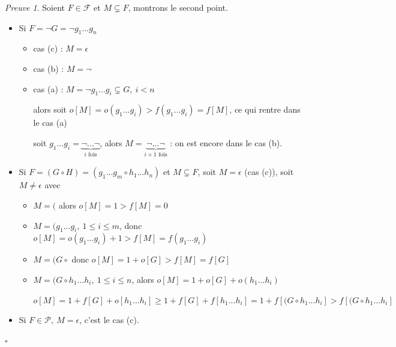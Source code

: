 \documentclass[]{article}
\theoremstyle{remark}
\newtheorem{myproof}{Preuve}
\theoremstyle{definition}
\newcommand{\cqfd}{
	\hfill$\square$
}
\begin{document}
\begin{myproof}
	Soient $F \in \mathcal{F}$ et $M \subsetneq F$, montrons le second point.
	
	\begin{itemize}
		\item Si $F=\neg G = \neg g_1 ... g_n$
		
		\begin{itemize}
			\item cas (c) : $M=\epsilon$
			\item cas (b) : $M=\neg$
			\item cas (a) : $M=\neg g_1 ... g_i \subsetneq G, ~ i < n$
			
			alors soit $o[M] = o(g_1...g_i) > f(g_1 ... g_i) = f[M]$, ce qui rentre dans le cas (a)
			
			soit $g_1...g_i = \underbrace{\neg ... \neg}_{i \text{ fois}}$, alors $M=\underbrace{\neg ... \neg}_{i + 1 \text{ fois}}$ : on est encore dans le cas (b).
		\end{itemize}
		
		\item Si $F=(G \circ H) = (g_1 ... g_m \circ h_1 ... h_n)$ et $M \subsetneq F$, soit $M=\epsilon$ (cas (c)), soit $M \neq \epsilon$ avec
		
		\begin{itemize}
			\item $M=($ alors $o[M]=1 > f[M] = 0$
			\item $M=(g_1...g_i, ~ 1 \leqslant i \leqslant m$, donc $o[M]=o(g_1...g_i) + 1 > f[M] = f(g_1...g_i)$
			\item $M=(G \circ$ donc $o[M]=1+o[G] > f[M]=f[G]$
			\item $M=(G \circ h_1 ... h_i, ~ 1 \leqslant i \leqslant n$, alors $o[M] = 1 + o[G] + o(h_1...h_i)$
			
			$o[M] = 1 + f[G] + o[h_1...h_i] \geqslant 1 + f[G] + f[h_1...h_i] = 1 + f[(G \circ h_1...h_i] > f[(G \circ h_1...h_i]$
		\end{itemize}
		
		\item Si $F \in \mathcal{P}, ~ M=\epsilon$, c'est le cas (c).
	\end{itemize}
	
	\cqfd
\end{myproof}
\end{document}
